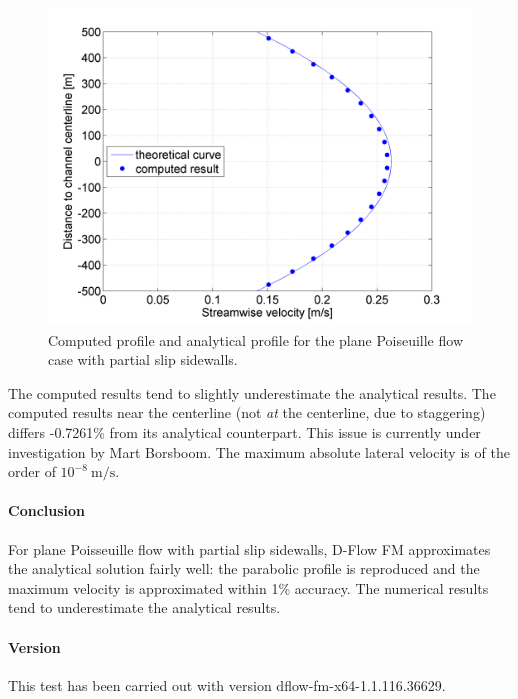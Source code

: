 \begin{figure}[h!]
\begin{center}
\includegraphics[width=0.65\columnwidth]{figures/poiseuillepartialslip.png}
\end{center}\caption{Computed profile and analytical profile for the plane Poiseuille flow case with partial slip sidewalls. \label{fig:poiseuillepartialslip}}
\end{figure}

The computed results tend to slightly underestimate the analytical results. The computed results near the centerline (not \emph{at} the centerline, due to staggering) differs -0.7261\% from its analytical counterpart. This issue is currently under investigation by Mart Borsboom. The maximum absolute lateral velocity is of the order of $10^{-8}~\textrm{m/s}$.


\paragraph*{Conclusion}
For plane Poisseuille flow with partial slip sidewalls, D-Flow FM approximates the analytical solution fairly well: the parabolic profile is reproduced and the maximum velocity is approximated within 1\% accuracy. The numerical results tend to underestimate the analytical results.



\paragraph*{Version}
This test has been carried out with version dflow-fm-x64-1.1.116.36629.


